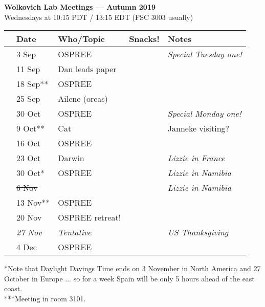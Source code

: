 \documentclass[11pt]{article}
\begin{document}
 
\raggedright
{}

\begin{center} 
{\large \textbf{Wolkovich Lab Meetings --- Autumn 2019}} \\ [2pt]
Wednesdays at 10:15 PDT / 13:15 EDT (FSC 3003 usually)\\
\end{center} 

\begin{center}
\begin{tabular}{ p{0.2 cm}  p{2 cm}  p{5 cm}  p{2 cm}  p{4 cm} }  \hline \hline
 & \textbf{Date}
   & \textbf{Who/Topic}
      & \textbf{Snacks!} 
         & \textbf{Notes} \\ 
\hline \hline
 & 3 Sep & OSPREE &       &  \emph{Special Tuesday one!}\\\hline
 & 11 Sep & Dan leads paper &       &  \\\hline
 & 18 Sep** & OSPREE &       & \\\hline  
 & 25 Sep & Ailene (orcas) &       &  \\\hline
 & 30 Oct & OSPREE &       &  \emph{Special Monday one!}\\\hline
 & 9 Oct** & Cat &     & Janneke visiting? \\\hline
 & 16 Oct& OSPREE &       &  \\\hline %
 & 23 Oct  & Darwin &       & \emph{Lizzie in France}  \\\hline
 & 30 Oct* & OSPREE &   & \emph{Lizzie in Namibia}     \\\hline
 & \sout{6 Nov} &  &       &  \emph{Lizzie in Namibia}  \\\hline
 & 13 Nov** & OSPREE &       &  \\\hline
 & 20 Nov & OSPREE retreat!&       &  \\\hline
 & \emph{27 Nov} & \emph{Tentative} &   & \emph{US Thanksgiving} \\\hline
 & 4 Dec & OSPREE &    & \\\hline


\hline
\end{tabular}
\end{center}
*Note that Daylight Davings Time ends on 3 November in North America and 27 October in Europe ... so for a week Spain will be only 5 hours ahead of the east coast.\\
***Meeting in room 3101.
\end{document}
